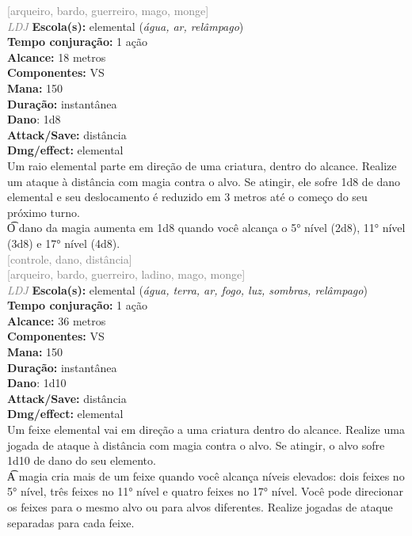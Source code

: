 \documentclass{RPG_Adventure}[2021/10/20]
\begin{document}
{\scriptsize \textcolor{gray}{[arqueiro, bardo, guerreiro, mago, monge]\\}}
{\tiny \textcolor{gray}{\textit{LDJ}}}
{\small \t \textbf{Escola(s):} elemental (\textit{água, ar, relâmpago})\\\t \textbf{Tempo conjuração:} 1 ação\\\t \textbf{Alcance:} 18 metros\\\t \textbf{Componentes:} VS\\\t \textbf{Mana:} 150\\\t \textbf{Duração:} instantânea\\\t \textbf{Dano}: 1d8\\\t \textbf{Attack/Save:} distância\\\t \textbf{Dmg/effect:} elemental\\}
{\normalsize Um raio elemental parte em direção de uma criatura, dentro do alcance. Realize um ataque à distância com magia contra o alvo. Se atingir, ele sofre 1d8 de dano elemental e seu deslocamento é reduzido em 3 metros até o começo do seu próximo turno.\\\t O dano da magia aumenta em 1d8 quando você alcança o 5° nível (2d8), 11° nível (3d8) e 17° nível (4d8).\\}
{\scriptsize \textcolor{gray}{[controle, dano, distância]\\}}
{\scriptsize \textcolor{gray}{[arqueiro, bardo, guerreiro, ladino, mago, monge]\\}}
{\tiny \textcolor{gray}{\textit{LDJ}}}
{\small \t \textbf{Escola(s):} elemental (\textit{água, terra, ar, fogo, luz, sombras, relâmpago})\\\t \textbf{Tempo conjuração:} 1 ação\\\t \textbf{Alcance:} 36 metros\\\t \textbf{Componentes:} VS\\\t \textbf{Mana:} 150\\\t \textbf{Duração:} instantânea\\\t \textbf{Dano}: 1d10\\\t \textbf{Attack/Save:} distância\\\t \textbf{Dmg/effect:} elemental\\}
{\normalsize Um feixe elemental vai em direção a uma criatura dentro do alcance. Realize uma jogada de ataque à distância com magia contra o alvo. Se atingir, o alvo sofre 1d10 de dano do seu elemento.\\\t A magia cria mais de um feixe quando você alcança níveis elevados: dois feixes no 5° nível, três feixes no 11° nível e quatro feixes no 17° nível. Você pode direcionar os feixes para o mesmo alvo ou para alvos diferentes. Realize jogadas de ataque separadas para cada feixe.\\}
\end{document}
